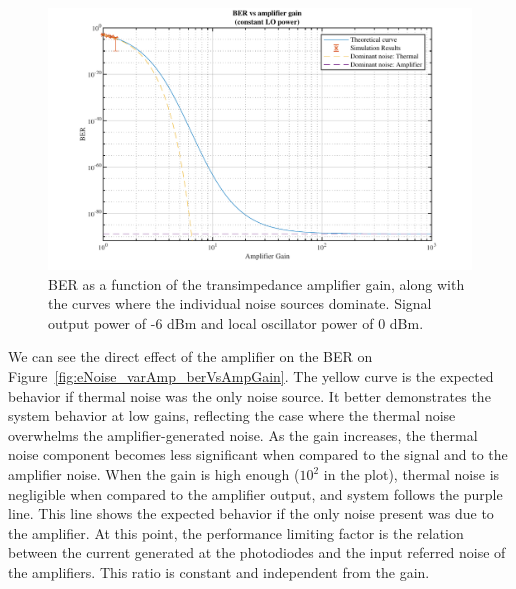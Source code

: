 	\begin{figure}[H]
	\centering
	\includegraphics[width=1\textwidth]
	{sdf/m_qam_system/figures/simulations/03_eNoise/berVsAmpGain_6dBm.pdf}
	\caption{BER as a function of the transimpedance amplifier 
		gain, along with the curves where the individual noise sources dominate. 
		Signal output power of -6 dBm and local oscillator power of 0 dBm.
	}\label{fig:eNoise_varAmp_berVsAmpGain6dBm}
\end{figure}

We can see the direct effect of the amplifier on the BER on 
Figure~\ref{fig:eNoise_varAmp_berVsAmpGain}.
The yellow curve is the expected behavior if thermal noise was the only noise 
source. It 
better demonstrates the system behavior at low gains, 
reflecting the case where the thermal noise 
overwhelms the amplifier-generated noise. As 
the gain increases, the thermal noise component becomes less significant when 
compared to the signal and to the amplifier noise. When the gain is high enough 
($10^2$ in the plot), thermal noise is negligible when compared to the 
amplifier output, and system follows the purple line. This line shows the 
expected behavior if the only noise present was due to the amplifier. At this 
point, the 
performance limiting factor is the relation between the current 
generated at the photodiodes and the input referred noise of the amplifiers. 
This ratio is constant and independent from the gain.


